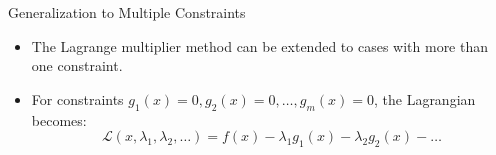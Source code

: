 \documentclass[serif, aspectratio=169]{beamer}
\DeclareMathOperator*{\argmax}{argmax}
\begin{document}
\begin{frame}{Generalization to Multiple Constraints}
    \begin{itemize}
    \item The Lagrange multiplier method can be extended to cases with more than one constraint.
    \item For constraints $g_1(x) = 0, g_2(x) = 0, \dots, g_m(x) = 0$, the Lagrangian becomes:
    \[
    \mathcal{L}(x, \lambda_1, \lambda_2, \dots) = f(x) - \lambda_1 g_1(x) - \lambda_2 g_2(x) - \dots
    \]
    \end{itemize}
\end{frame}





\end{document}
